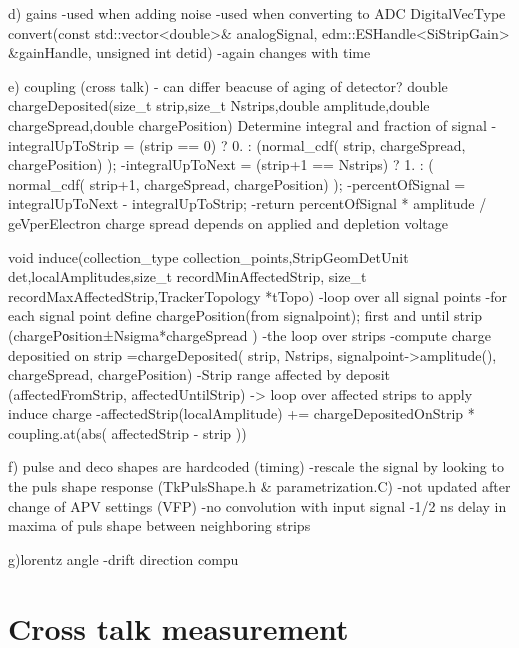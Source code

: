 d) gains
-used when adding noise
-used when converting to ADC
DigitalVecType convert(const std::vector<double>& analogSignal, edm::ESHandle<SiStripGain> \&gainHandle, unsigned int detid)
-again changes with time

e) coupling (cross talk)
- can differ beacuse of aging of detector?
double chargeDeposited(size\_t strip,size\_t Nstrips,double amplitude,double chargeSpread,double chargePosition)
Determine integral and fraction of signal
-integralUpToStrip = (strip == 0) ? 0. : (normal\_cdf( strip, chargeSpread, chargePosition) );
-integralUpToNext = (strip+1 == Nstrips) ? 1. : ( normal\_cdf( strip+1, chargeSpread, chargePosition) );
-percentOfSignal = integralUpToNext - integralUpToStrip;
-return percentOfSignal * amplitude / geVperElectron
charge spread depends on applied and depletion voltage

void induce(collection\_type collection\_points,StripGeomDetUnit det,localAmplitudes,size\_t recordMinAffectedStrip, size\_t recordMaxAffectedStrip,TrackerTopology *tTopo)
-loop over all signal points 
-for each signal point define chargePosition(from signalpoint); first and until strip (chargePоsition±Nsigma*chargeSpread )
-the loop over strips 
-compute charge depositied on strip =chargeDeposited( strip, Nstrips, signalpoint->amplitude(), chargeSpread, chargePosition)
-Strip range affected by deposit (affectedFromStrip, affectedUntilStrip) -> loop over affected strips to apply induce charge
	-affectedStrip(localAmplitude)  += chargeDepositedOnStrip * coupling.at(abs( affectedStrip - strip ))


f) pulse and deco shapes are hardcoded (timing)
-rescale  the signal by looking to the puls shape response (TkPulsShape.h & parametrization.C)
-not updated after change of APV settings (VFP)
-no convolution with input signal
-1/2 ns delay in maxima of puls shape between neighboring strips

g)lorentz angle
-drift direction compu


\section{Cross talk measurement}



